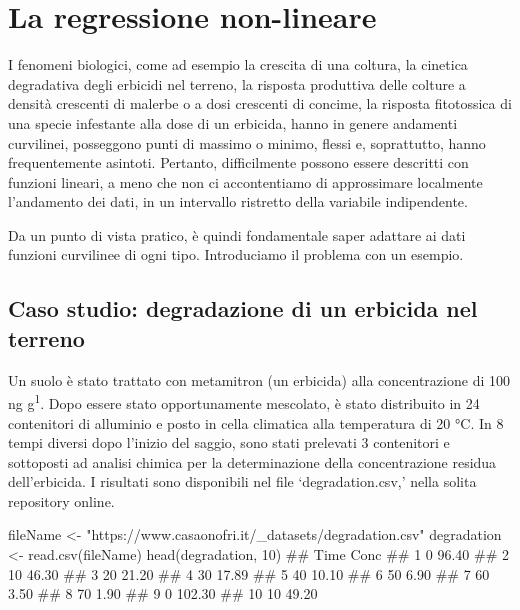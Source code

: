 \documentclass[a4paper,12pt,oneside]{book}
\newenvironment{Shaded}{\begin{snugshade}}{\end{snugshade}}
\newcommand{\DecValTok}[1]{#1}
\newcommand{\StringTok}[1]{#1}
\newcommand{\DocumentationTok}[1]{#1}
\newcommand{\OtherTok}[1]{#1}
\newcommand{\FunctionTok}[1]{#1}
\newcommand{\NormalTok}[1]{#1}
\begin{document}
\hypertarget{la-regressione-non-lineare}{%
\chapter{La regressione non-lineare}\label{la-regressione-non-lineare}}

I fenomeni biologici, come ad esempio la crescita di una coltura, la cinetica degradativa degli erbicidi nel terreno, la risposta produttiva delle colture a densità crescenti di malerbe o a dosi crescenti di concime, la risposta fitotossica di una specie infestante alla dose di un erbicida, hanno in genere andamenti curvilinei, posseggono punti di massimo o minimo, flessi e, soprattutto, hanno frequentemente asintoti. Pertanto, difficilmente possono essere descritti con funzioni lineari, a meno che non ci accontentiamo di approssimare localmente l'andamento dei dati, in un intervallo ristretto della variabile indipendente.

Da un punto di vista pratico, è quindi fondamentale saper adattare ai dati funzioni curvilinee di ogni tipo. Introduciamo il problema con un esempio.

\hypertarget{caso-studio-degradazione-di-un-erbicida-nel-terreno}{%
\section{Caso studio: degradazione di un erbicida nel terreno}\label{caso-studio-degradazione-di-un-erbicida-nel-terreno}}

Un suolo è stato trattato con metamitron (un erbicida) alla concentrazione di 100 ng g\textsuperscript{1}. Dopo essere stato opportunamente mescolato, è stato distribuito in 24 contenitori di alluminio e posto in cella climatica alla temperatura di 20 °C. In 8 tempi diversi dopo l'inizio del saggio, sono stati prelevati 3 contenitori e sottoposti ad analisi chimica per la determinazione della concentrazione residua dell'erbicida. I risultati sono disponibili nel file `degradation.csv,' nella solita repository online.

\begin{Shaded}
\begin{Highlighting}[]
\NormalTok{fileName }\OtherTok{\textless{}{-}} \StringTok{"https://www.casaonofri.it/\_datasets/degradation.csv"}
\NormalTok{degradation }\OtherTok{\textless{}{-}} \FunctionTok{read.csv}\NormalTok{(fileName)}
\FunctionTok{head}\NormalTok{(degradation, }\DecValTok{10}\NormalTok{)}
\DocumentationTok{\#\#    Time   Conc}
\DocumentationTok{\#\# 1     0  96.40}
\DocumentationTok{\#\# 2    10  46.30}
\DocumentationTok{\#\# 3    20  21.20}
\DocumentationTok{\#\# 4    30  17.89}
\DocumentationTok{\#\# 5    40  10.10}
\DocumentationTok{\#\# 6    50   6.90}
\DocumentationTok{\#\# 7    60   3.50}
\DocumentationTok{\#\# 8    70   1.90}
\DocumentationTok{\#\# 9     0 102.30}
\DocumentationTok{\#\# 10   10  49.20}
\end{Highlighting}
\end{Shaded}
\end{document}
